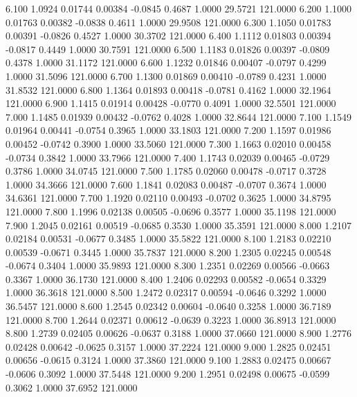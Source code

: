    6.100   1.0924   0.01744   0.00384  -0.0845   0.4687   1.0000  29.5721 121.0000
   6.200   1.1000   0.01763   0.00382  -0.0838   0.4611   1.0000  29.9508 121.0000
   6.300   1.1050   0.01783   0.00391  -0.0826   0.4527   1.0000  30.3702 121.0000
   6.400   1.1112   0.01803   0.00394  -0.0817   0.4449   1.0000  30.7591 121.0000
   6.500   1.1183   0.01826   0.00397  -0.0809   0.4378   1.0000  31.1172 121.0000
   6.600   1.1232   0.01846   0.00407  -0.0797   0.4299   1.0000  31.5096 121.0000
   6.700   1.1300   0.01869   0.00410  -0.0789   0.4231   1.0000  31.8532 121.0000
   6.800   1.1364   0.01893   0.00418  -0.0781   0.4162   1.0000  32.1964 121.0000
   6.900   1.1415   0.01914   0.00428  -0.0770   0.4091   1.0000  32.5501 121.0000
   7.000   1.1485   0.01939   0.00432  -0.0762   0.4028   1.0000  32.8644 121.0000
   7.100   1.1549   0.01964   0.00441  -0.0754   0.3965   1.0000  33.1803 121.0000
   7.200   1.1597   0.01986   0.00452  -0.0742   0.3900   1.0000  33.5060 121.0000
   7.300   1.1663   0.02010   0.00458  -0.0734   0.3842   1.0000  33.7966 121.0000
   7.400   1.1743   0.02039   0.00465  -0.0729   0.3786   1.0000  34.0745 121.0000
   7.500   1.1785   0.02060   0.00478  -0.0717   0.3728   1.0000  34.3666 121.0000
   7.600   1.1841   0.02083   0.00487  -0.0707   0.3674   1.0000  34.6361 121.0000
   7.700   1.1920   0.02110   0.00493  -0.0702   0.3625   1.0000  34.8795 121.0000
   7.800   1.1996   0.02138   0.00505  -0.0696   0.3577   1.0000  35.1198 121.0000
   7.900   1.2045   0.02161   0.00519  -0.0685   0.3530   1.0000  35.3591 121.0000
   8.000   1.2107   0.02184   0.00531  -0.0677   0.3485   1.0000  35.5822 121.0000
   8.100   1.2183   0.02210   0.00539  -0.0671   0.3445   1.0000  35.7837 121.0000
   8.200   1.2305   0.02245   0.00548  -0.0674   0.3404   1.0000  35.9893 121.0000
   8.300   1.2351   0.02269   0.00566  -0.0663   0.3367   1.0000  36.1730 121.0000
   8.400   1.2406   0.02293   0.00582  -0.0654   0.3329   1.0000  36.3618 121.0000
   8.500   1.2472   0.02317   0.00594  -0.0646   0.3292   1.0000  36.5457 121.0000
   8.600   1.2545   0.02342   0.00604  -0.0640   0.3258   1.0000  36.7189 121.0000
   8.700   1.2644   0.02371   0.00612  -0.0639   0.3223   1.0000  36.8913 121.0000
   8.800   1.2739   0.02405   0.00626  -0.0637   0.3188   1.0000  37.0660 121.0000
   8.900   1.2776   0.02428   0.00642  -0.0625   0.3157   1.0000  37.2224 121.0000
   9.000   1.2825   0.02451   0.00656  -0.0615   0.3124   1.0000  37.3860 121.0000
   9.100   1.2883   0.02475   0.00667  -0.0606   0.3092   1.0000  37.5448 121.0000
   9.200   1.2951   0.02498   0.00675  -0.0599   0.3062   1.0000  37.6952 121.0000
